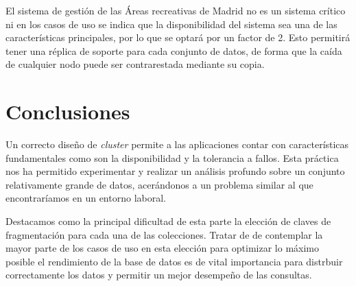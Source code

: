 \documentclass[]{article}
\begin{document}
El sistema de gestión de las Áreas recreativas de Madrid no es un sistema crítico ni en los casos de uso se indica que la disponibilidad del sistema sea una de las características principales, por lo que se optará por un factor de 2. Esto permitirá tener una réplica de soporte para cada conjunto de datos, de forma que la caída de cualquier nodo puede ser contrarestada mediante su copia.
\newpage

\section{Conclusiones}
\label{sec:conclusiones}

Un correcto diseño de \textit{cluster} permite a las aplicaciones contar con características fundamentales como son la disponibilidad y la tolerancia a fallos. Esta práctica nos ha permitido experimentar y realizar un análisis profundo sobre un conjunto relativamente grande de datos, acerándonos a un problema similar al que encontraríamos en un entorno laboral.

Destacamos como la principal dificultad de esta parte la elección de claves de fragmentación para cada una de las colecciones. Tratar de de contemplar la mayor parte de los casos de uso en esta elección para optimizar lo máximo posible el rendimiento de la base de datos es de vital importancia para distrbuir correctamente los datos y permitir un mejor desempeño de las consultas.
\end{document}
